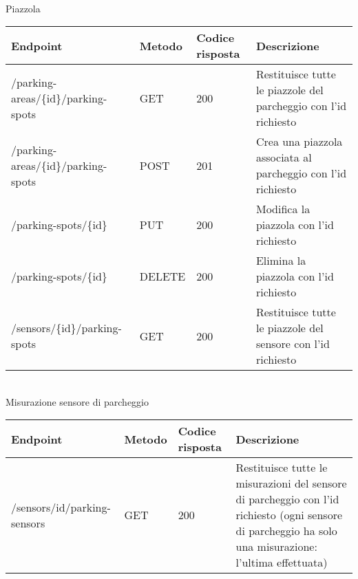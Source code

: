 \leavevmode\newline
\\
Piazzola
\\
\begin{table}
    \begin{tabular}{|p{3.2cm}|p{1.4cm}|p{1.4cm}|p{5.8cm}|} 
    \hline
    \textbf{Endpoint} & \textbf{Metodo} & \textbf{Codice risposta} & \textbf{Descrizione} \\ 
    \hline
    /parking-areas/\{id\}/parking-spots & GET & 200 & Restituisce tutte le piazzole del parcheggio con l'id 
    richiesto \\ 
    \hline
    /parking-areas/\{id\}/parking-spots & POST & 201 & Crea una piazzola associata al parcheggio con l'id 
    richiesto \\ 
    \hline
    /parking-spots/\{id\} & PUT & 200 & Modifica la piazzola con l'id richiesto \\ 
    \hline
    /parking-spots/\{id\} & DELETE & 200 & Elimina la piazzola con l'id richiesto \\ 
    \hline
    /sensors/\{id\}/parking-spots & GET & 200 & Restituisce tutte le piazzole del sensore con l'id 
    richiesto \\ 
    \hline
    \end{tabular}
\end{table}
\leavevmode\newline
\\
Misurazione sensore di parcheggio
\\
\begin{table}
    \begin{tabular}{|p{3.2cm}|p{1.4cm}|p{1.4cm}|p{5.8cm}|} 
    \hline
    \textbf{Endpoint} & \textbf{Metodo} & \textbf{Codice risposta} & \textbf{Descrizione} \\ 
    \hline
    /sensors/{id}/parking-sensors & GET & 200 & Restituisce tutte le misurazioni del sensore di parcheggio con l'id 
    richiesto (ogni sensore di parcheggio ha solo una misurazione: l'ultima effettuata) \\ 
    \hline
    \end{tabular}
\end{table}